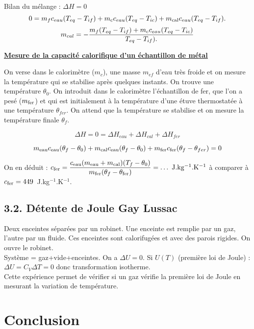 \documentclass[french, a4paper, 10pt, twocolumn, landscape]{article}
\begin{document}
Bilan du mélange : $\Delta H = 0 $ 
$$0 = m_{f}c_{eau}(T_{eq}-T_{if})+m_{\rm c}c_{eau}(T_{eq}-T_{ic})+m_{\rm cal}c_{eau}(T_{eq}-T_{if}).$$ 
$$m_{cal} = -\dfrac{m_{f}(T_{eq}-T_{if})+m_{\rm c}c_{eau}(T_{eq}-T_{ic})}{T_{eq}-T_{if}).}$$


\noindent\underline{\textbf{Mesure de la capacité calorifique d'un échantillon de métal}}

On verse dans le calorimètre ($m_c$), une masse $m_{ef}$ d'eau très froide et on mesure la température qui se stabilise après quelques instants. On trouve une température $\theta_0$. On introduit dans le calorimètre l'échantillon de fer, que l'on a pesé ($m_{\rm fer}$) et qui est initialement à la température d'une étuve thermostatée à une température $\theta_{fer}$. On attend que la température se stabilise et on mesure la température finale $\theta_f$.

\begin{equation}
    \Delta H = 0 = \Delta H_{eau}+\Delta H_{cal} + \Delta H_{fer}
\end{equation}

\begin{equation}
    m_{\rm eau}c_{\rm eau}(\theta_f - \theta_0)+m_{\rm cal}c_{\rm eau}(\theta_f - \theta_0) + m_{\rm fer}c_{\rm fer}(\theta_f-\theta_{fer})=0
\end{equation}



On en déduit : $c_{\rm fer}=\dfrac{c_{\rm eau}(m_{\rm eau}+m_{\rm cal})(T_{f}-\theta_0)}{m_{\rm fer}(\theta_f-\theta_{\rm fer})}\rm =\dots ~J.kg^{-1}.K^{-1}$ à comparer à $c_{\rm fer}=449$~J.kg$^{-1}$.K$^{-1}$.
\subsection*{3.2. Détente de Joule Gay Lussac}


Deux enceintes séparées par un robinet. Une enceinte est remplie par un gaz, l'autre par un fluide. Ces enceintes sont calorifugées et avec des parois rigides. On ouvre le robinet. \\
  Système = {gaz+vide+enceintes}. On a $\Delta U=0$. Si $U(T)$ (première loi de Joule) : $\Delta U = C_{V}\Delta T = 0$ donc transformation isotherme. \\
  Cette expérience permet de vérifier si un gaz vérifie la première loi de Joule en mesurant la variation de température.
  

\section*{Conclusion}
\end{document}
